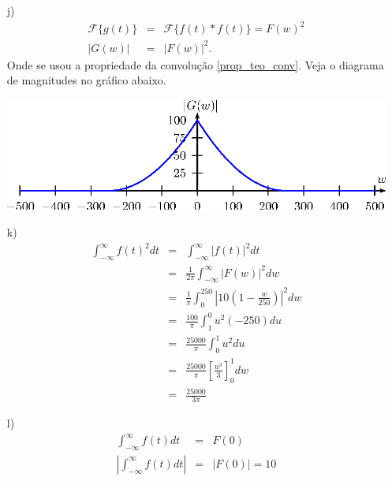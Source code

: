\begin{resp}
\begin{itemize}
    \item[j)] 
    \begin{eqnarray*}
    \mathcal{F}\{g(t)\}&=&\mathcal{F}\{f(t)\ast f(t)\}=F(w)^2 \\
    |G(w)|&=&|F(w)|^2.
    \end{eqnarray*}
    Onde se usou a propriedade da convolução  \ref{prop_teo_conv}. Veja o diagrama de magnitudes no gráfico abaixo.
    \begin{center}
    \includegraphics{cap_propriedades_transformada/pics/figura_20}\end{center}
    \item[k)] 
    \begin{eqnarray*}
    \int_{-\infty}^\infty f(t)^2dt&=&\int_{-\infty}^\infty |f(t)|^2dt\\
    &=&\frac{1}{2\pi}\int_{-\infty}^\infty |F(w)|^2dw\\
    &=&\frac{1}{\pi}\int_{0}^{250} \left|10\left(1-\frac{w}{250}\right)\right|^2dw\\
    &=&\frac{100}{\pi}\int_{1}^{0}  u^2\left(-250\right)du\\
    &=&\frac{25000}{\pi}\int_{0}^{1}  u^2du\\
    &=&\frac{25000}{\pi}\left[\frac{u^3}{3}\right]_{0}^{1}dw\\
    &=&\frac{25000}{3\pi}
    \end{eqnarray*}
    \item[l)] 
    \begin{eqnarray*}
    \int_{-\infty}^\infty f(t)dt&=& F(0)\\
    \left|\int_{-\infty}^\infty f(t)dt\right|&=& |F(0)|=10
    \end{eqnarray*}
    \end{itemize}
    \end{resp}

